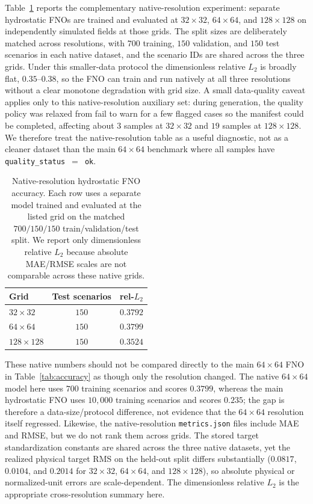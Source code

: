 Table~\ref{tab:crossres-native} reports the complementary native-resolution experiment: separate hydrostatic FNOs are trained and evaluated at $32 \times 32$, $64 \times 64$, and $128 \times 128$ on independently simulated fields at those grids. The split sizes are deliberately matched across resolutions, with $700$ training, $150$ validation, and $150$ test scenarios in each native dataset, and the scenario IDs are shared across the three grids. Under this smaller-data protocol the dimensionless relative $L_2$ is broadly flat, $0.35$--$0.38$, so the FNO can train and run natively at all three resolutions without a clear monotone degradation with grid size. A small data-quality caveat applies only to this native-resolution auxiliary set: during generation, the quality policy was relaxed from fail to warn for a few flagged cases so the manifest could be completed, affecting about $3$ samples at $32 \times 32$ and $19$ samples at $128 \times 128$. We therefore treat the native-resolution table as a useful diagnostic, not as a cleaner dataset than the main $64 \times 64$ benchmark where all samples have \texttt{quality\_status}~$=$~\texttt{ok}.

\begin{table}[H]
\centering
\caption{Native-resolution hydrostatic FNO accuracy. Each row uses a separate model trained and evaluated at the listed grid on the matched $700/150/150$ train/validation/test split. We report only dimensionless relative $L_2$ because absolute MAE/RMSE scales are not comparable across these native grids.}
\label{tab:crossres-native}
\begin{tabular}{lcc}
    \toprule
    Grid & Test scenarios & rel-$L_2$ \\
    \midrule
    $32 \times 32$   & $150$ & $0.3792$ \\
    $64 \times 64$   & $150$ & $0.3799$ \\
    $128 \times 128$ & $150$ & $0.3524$ \\
    \bottomrule
\end{tabular}
\end{table}

These native numbers should not be compared directly to the main $64 \times 64$ FNO in Table~\ref{tab:accuracy} as though only the resolution changed. The native $64 \times 64$ model here uses $700$ training scenarios and scores $0.3799$, whereas the main hydrostatic FNO uses $10{,}000$ training scenarios and scores $0.235$; the gap is therefore a data-size/protocol difference, not evidence that the $64 \times 64$ resolution itself regressed. Likewise, the native-resolution \texttt{metrics.json} files include MAE and RMSE, but we do not rank them across grids. The stored target standardization constants are shared across the three native datasets, yet the realized physical target RMS on the held-out split differs substantially ($0.0817$, $0.0104$, and $0.2014$ for $32 \times 32$, $64 \times 64$, and $128 \times 128$), so absolute physical or normalized-unit errors are scale-dependent. The dimensionless relative $L_2$ is the appropriate cross-resolution summary here.

